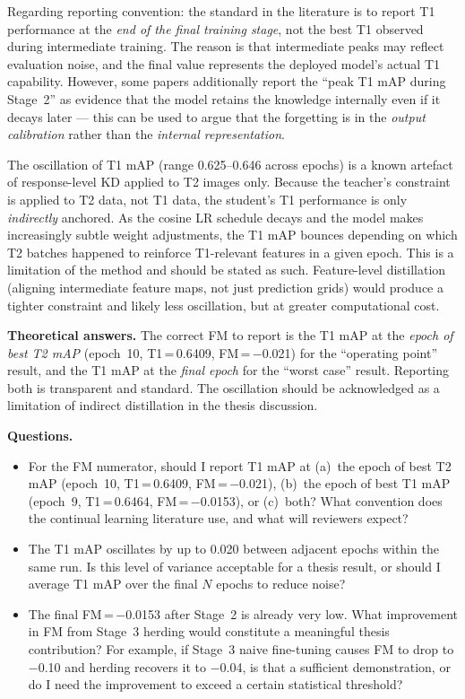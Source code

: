Regarding reporting convention: the standard in the literature is
to report T1 performance at the \emph{end of the final training
stage}, not the best T1 observed during intermediate training. The
reason is that intermediate peaks may reflect evaluation noise, and
the final value represents the deployed model's actual T1 capability.
However, some papers additionally report the ``peak T1 mAP during
Stage~2'' as evidence that the model retains the knowledge
internally even if it decays later --- this can be used to argue
that the forgetting is in the \emph{output calibration} rather
than the \emph{internal representation}.

The oscillation of T1 mAP (range 0.625--0.646 across epochs) is a
known artefact of response-level KD applied to T2 images only.
Because the teacher's constraint is applied to T2 data, not T1 data,
the student's T1 performance is only \emph{indirectly} anchored.
As the cosine LR schedule decays and the model makes increasingly
subtle weight adjustments, the T1 mAP bounces depending on which
T2 batches happened to reinforce T1-relevant features in a given epoch.
This is a limitation of the method and should be stated as such.
Feature-level distillation (aligning intermediate feature maps, not
just prediction grids) would produce a tighter constraint and likely
less oscillation, but at greater computational cost.

\textbf{Theoretical answers.}
The correct FM to report is the T1 mAP at the \emph{epoch of best
T2 mAP} (epoch~10, T1\,=\,0.6409, FM\,=\,$-$0.021) for the
``operating point'' result, and the T1 mAP at the \emph{final
epoch} for the ``worst case'' result. Reporting both is
transparent and standard. The oscillation should be acknowledged
as a limitation of indirect distillation in the thesis discussion.

\textbf{Questions.}
\begin{itemize}
    \item For the FM numerator, should I report T1 mAP at
          (a)~the epoch of best T2 mAP (epoch~10, T1\,=\,0.6409,
          FM\,=\,$-$0.021), (b)~the epoch of best T1 mAP (epoch~9,
          T1\,=\,0.6464, FM\,=\,$-$0.0153), or (c)~both?
          What convention does the continual learning literature
          use, and what will reviewers expect?

    \item The T1 mAP oscillates by up to 0.020 between adjacent
          epochs within the same run. Is this level of variance
          acceptable for a thesis result, or should I average
          T1 mAP over the final $N$ epochs to reduce noise?

    \item The final FM\,=\,$-$0.0153 after Stage~2 is already
          very low. What improvement in FM from Stage~3 herding
          would constitute a meaningful thesis contribution?
          For example, if Stage~3 naive fine-tuning causes FM to
          drop to $-$0.10 and herding recovers it to $-$0.04,
          is that a sufficient demonstration, or do I need
          the improvement to exceed a certain statistical threshold?
\end{itemize}

